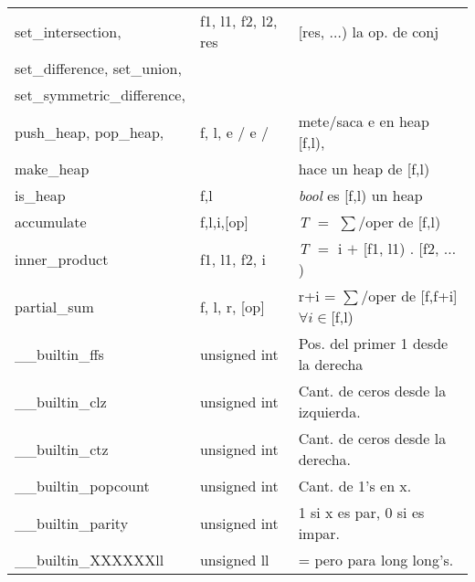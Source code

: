 \begin{tabular}{|l|l|p{5.4cm}|}
set\_intersection, & f1, l1, f2, l2, res & [res, $\ldots$) la op. de conj\\
set\_difference, set\_union, & & \\
set\_symmetric\_difference, & &\\\hline
push\_heap, pop\_heap, & f, l, e / e / & mete/saca e en heap [f,l), \\
make\_heap & & hace un heap de [f,l)\\\hline
is\_heap & f,l & \textit{bool} es [f,l) un heap\\\hline
accumulate & f,l,i,[op] & \textit{T} $=$ $\sum$/oper de [f,l)\\\hline
inner\_product & f1, l1, f2, i & \textit{T} $=$ i $+$ [f1, l1) . [f2, $\ldots$ )\\\hline
partial\_sum & f, l, r, [op] & r+i = $\sum$/oper de [f,f+i] $\forall i \in$[f,l)\\\hline
\_\_builtin\_ffs& unsigned int & Pos. del primer 1 desde la derecha\\\hline
\_\_builtin\_clz & unsigned int & Cant. de ceros desde la izquierda.\\\hline
\_\_builtin\_ctz & unsigned int & Cant. de ceros desde la derecha.\\\hline
\_\_builtin\_popcount & unsigned int & Cant. de 1’s en x.\\\hline
\_\_builtin\_parity & unsigned int & 1 si x es par, 0 si es impar.\\\hline
\_\_builtin\_XXXXXXll & unsigned ll & = pero para long long's.\\\hline
\end{tabular}
